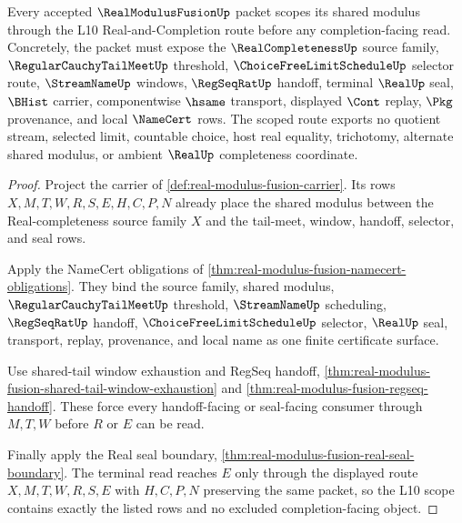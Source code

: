 \begin{theorem}
\label{thm:real-modulus-fusion-l10-scope-route}
Every accepted $\RealModulusFusionUp$ packet scopes its shared modulus through the L10 Real-and-Completion route before any completion-facing read. Concretely, the packet must expose the $\RealCompletenessUp$ source family, $\RegularCauchyTailMeetUp$ threshold, $\ChoiceFreeLimitScheduleUp$ selector route, $\StreamNameUp$ windows, $\RegSeqRatUp$ handoff, terminal $\RealUp$ seal, $\BHist$ carrier, componentwise $\hsame$ transport, displayed $\Cont$ replay, $\Pkg$ provenance, and local $\NameCert$ rows. The scoped route exports no quotient stream, selected limit, countable choice, host real equality, trichotomy, alternate shared modulus, or ambient $\RealUp$ completeness coordinate.
\end{theorem}
\begin{proof}
Project the carrier of \autoref{def:real-modulus-fusion-carrier}. Its rows $X,M,T,W,R,S,E,H,C,P,N$ already place the shared modulus between the Real-completeness source family $X$ and the tail-meet, window, handoff, selector, and seal rows.

Apply the NameCert obligations of \autoref{thm:real-modulus-fusion-namecert-obligations}. They bind the source family, shared modulus, $\RegularCauchyTailMeetUp$ threshold, $\StreamNameUp$ scheduling, $\RegSeqRatUp$ handoff, $\ChoiceFreeLimitScheduleUp$ selector, $\RealUp$ seal, transport, replay, provenance, and local name as one finite certificate surface.

Use shared-tail window exhaustion and RegSeq handoff, \autoref{thm:real-modulus-fusion-shared-tail-window-exhaustion} and \autoref{thm:real-modulus-fusion-regseq-handoff}. These force every handoff-facing or seal-facing consumer through $M,T,W$ before $R$ or $E$ can be read.

Finally apply the Real seal boundary, \autoref{thm:real-modulus-fusion-real-seal-boundary}. The terminal read reaches $E$ only through the displayed route $X,M,T,W,R,S,E$ with $H,C,P,N$ preserving the same packet, so the L10 scope contains exactly the listed rows and no excluded completion-facing object.
\end{proof}

